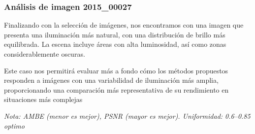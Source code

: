 \documentclass[sigchi]{acmart}
\begin{document}
\subsubsection{\textbf{Análisis de imagen 2015\_00027}}

Finalizando con la selección de imágenes, nos encontramos con una imagen que presenta una
iluminación más natural, con una distribución de brillo más equilibrada. La escena incluye
áreas con alta luminosidad, así como zonas considerablemente oscuras.

Este caso nos permitirá evaluar más a fondo cómo los métodos propuestos responden a imágenes
con una variabilidad de iluminación más amplia, proporcionando una comparación más
representativa de su rendimiento en situaciones más complejas

\begin{table}[H]
	\centering
	\caption{Métricas de calidad para la imagen 2015\_00027.jpg}
	\label{tab:metricas_2015_00027}
	\vspace{0.5em}


	\vspace{0.5em}
	\footnotesize%
	\textit{Nota: AMBE (menor es mejor), PSNR (mayor es mejor). Uniformidad: 0.6–0.85 optimo}
\end{table}
\end{document}
